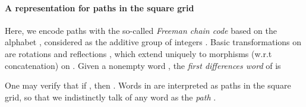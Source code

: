 \paragraph{A representation for paths in the square grid}





Here, we encode paths with the so-called \emph{Freeman chain code}\cite{freeman1} based on the  alphabet , considered as the additive group of integers . 
Basic transformations on  are rotations  and reflections ,  which extend uniquely to morphisms (w.r.t  concatenation) on . 
Given a nonempty word , the \emph{first differences word}  of  is

One may verify that if , then .
Words in  are interpreted as paths in the square grid, so that we indistinctly talk of any word  as the \emph{path} . 
